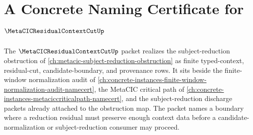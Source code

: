 \chapter{A Concrete Naming Certificate for $\MetaCICResidualContextCutUp$}
\label{ch:concrete-instances-metacic-residual-context-cut-namecert}

The $\MetaCICResidualContextCutUp$ packet realizes the subject-reduction obstruction of \autoref{ch:metacic-subject-reduction-obstruction} as finite typed-context, residual-cut, candidate-boundary, and provenance rows. It sits beside the finite-window normalization audit of \autoref{ch:concrete-instances-finite-window-normalization-audit-namecert}, the MetaCIC critical path of \autoref{ch:concrete-instances-metaciccriticalpath-namecert}, and the subject-reduction discharge packets already attached to the obstruction map. The packet names a boundary where a reduction residual must preserve enough context data before a candidate-normalization or subject-reduction consumer may proceed.

